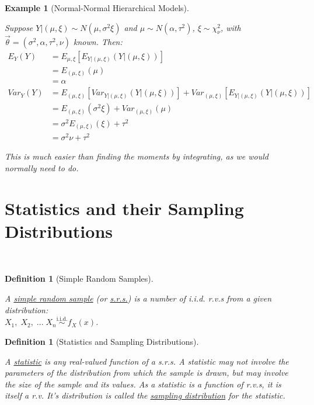 \documentclass[12pt,a4paper]{article}
\newtheorem{defn}[thm]{Definition}
\newtheorem{ex}[thm]{Example}
\begin{document}
\begin{ex}[Normal-Normal Hierarchical Models]$\quad$\par\vspace{1cm}

Suppose $Y|(\mu,\xi) \sim N(\mu,\sigma^2\xi)$ and $\mu \sim N(\alpha,\tau^2)$, $\xi \sim \chi^2_\nu$, with $\vec{\theta} = (\sigma^2, \alpha, \tau^2, \nu)$ known. Then:
\begin{align*}
E_Y(Y) &= E_{\mu,\xi}[E_{Y|(\mu,\xi)}(Y|(\mu,\xi))]\\
&= E_{(\mu,\xi)}(\mu)\\
&= \alpha\\
Var_Y(Y) &= E_{(\mu,\xi)}[Var_{Y|(\mu,\xi)}(Y|(\mu,\xi))] + Var_{(\mu,\xi)}[E_{Y|(\mu,\xi)}(Y|(\mu,\xi))]\\
&= E_{(\mu,\xi)}(\sigma^2\xi) + Var_{(\mu,\xi)}(\mu)\\
&= \sigma^2E_{(\mu,\xi)}(\xi) + \tau^2\\
&= \sigma^2\nu + \tau^2
\end{align*}

This is much easier than finding the moments by integrating, as we would normally need to do.

\end{ex}

\clearpage
\section{Statistics and their Sampling Distributions}$\;$

\begin{defn}[Simple Random Samples]$\;$\par\vspace{1cm}

A \underline{simple random sample} (or \underline{s.r.s.}) is a number of i.i.d. r.v.s from a given distribution:\\ $X_1,\;X_2,\; ...\; X_n \overset{\text{i.i.d.}}{\sim} f_X(x)$.
\end{defn}

\begin{defn}[Statistics and Sampling Distributions]$\;$\par\vspace{1cm}

A \underline{statistic} is any real-valued function of a s.r.s. A statistic may not involve the parameters of the distribution from which the sample is drawn, but may involve the size of the sample and its values. As a statistic is a function of r.v.s, it is itself a r.v. It's distribution is called the \underline{sampling distribution} for the statistic.

\end{defn}
\end{document}
